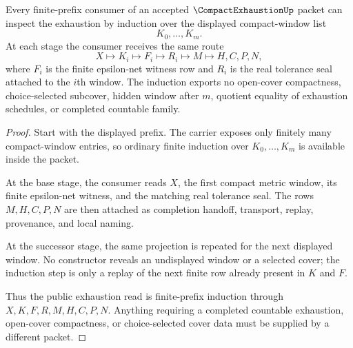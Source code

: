 \begin{theorem}
\label{thm:compact-exhaustion-finite-net-induction}
Every finite-prefix consumer of an accepted $\CompactExhaustionUp$ packet can inspect the exhaustion by induction over the displayed compact-window list
$$
K_0,\ldots,K_m .
$$
At each stage the consumer receives the same route
$$
X\longmapsto K_i\longmapsto F_i\longmapsto R_i\longmapsto M\longmapsto H,C,P,N ,
$$
where $F_i$ is the finite epsilon-net witness row and $R_i$ is the real tolerance seal attached to the $i$th window. The induction exports no open-cover compactness, choice-selected subcover, hidden window after $m$, quotient equality of exhaustion schedules, or completed countable family.
\end{theorem}
\begin{proof}
Start with the displayed prefix. The carrier exposes only finitely many compact-window entries, so ordinary finite induction over $K_0,\ldots,K_m$ is available inside the packet.

At the base stage, the consumer reads $X$, the first compact metric window, its finite epsilon-net witness, and the matching real tolerance seal. The rows $M,H,C,P,N$ are then attached as completion handoff, transport, replay, provenance, and local naming.

At the successor stage, the same projection is repeated for the next displayed window. No constructor reveals an undisplayed window or a selected cover; the induction step is only a replay of the next finite row already present in $K$ and $F$.

Thus the public exhaustion read is finite-prefix induction through $X,K,F,R,M,H,C,P,N$. Anything requiring a completed countable exhaustion, open-cover compactness, or choice-selected cover data must be supplied by a different packet.
\end{proof}



